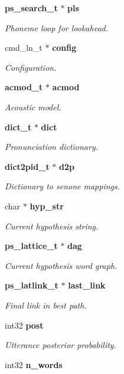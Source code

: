 \begin{DoxyCompactItemize}
\item 
{\bf ps\+\_\+search\+\_\+t} $\ast$ {\bf pls}
\begin{DoxyCompactList}\small\item\em Phoneme loop for lookahead. \end{DoxyCompactList}\item 
cmd\+\_\+ln\+\_\+t $\ast$ {\bf config}
\begin{DoxyCompactList}\small\item\em Configuration. \end{DoxyCompactList}\item 
{\bf acmod\+\_\+t} $\ast$ {\bf acmod}
\begin{DoxyCompactList}\small\item\em Acoustic model. \end{DoxyCompactList}\item 
{\bf dict\+\_\+t} $\ast$ {\bf dict}
\begin{DoxyCompactList}\small\item\em Pronunciation dictionary. \end{DoxyCompactList}\item 
{\bf dict2pid\+\_\+t} $\ast$ {\bf d2p}
\begin{DoxyCompactList}\small\item\em Dictionary to senone mappings. \end{DoxyCompactList}\item 
char $\ast$ {\bf hyp\+\_\+str}
\begin{DoxyCompactList}\small\item\em Current hypothesis string. \end{DoxyCompactList}\item 
{\bf ps\+\_\+lattice\+\_\+t} $\ast$ {\bf dag}
\begin{DoxyCompactList}\small\item\em Current hypothesis word graph. \end{DoxyCompactList}\item 
{\bf ps\+\_\+latlink\+\_\+t} $\ast$ {\bf last\+\_\+link}
\begin{DoxyCompactList}\small\item\em Final link in best path. \end{DoxyCompactList}\item 
int32 {\bf post}
\begin{DoxyCompactList}\small\item\em Utterance posterior probability. \end{DoxyCompactList}\item 
int32 {\bf n\+\_\+words}\label{structps__search__s_ad4d98deb905bd664ec44313ea0065b1a}


\end{DoxyCompactItemize}
